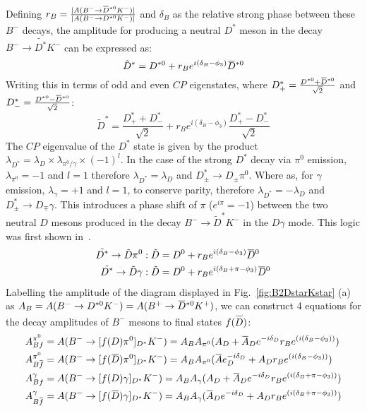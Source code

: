 \documentclass[oneside,12pt]{article}
\newcommand{\overbar}[1]{\mkern 1.5mu\overline{\mkern-1.5mu#1\mkern-1.5mu}\mkern
1.5mu}
\newcommand\brobor{\smash[b]{\raisebox{0.6\height}{\scalebox{0.5}{\tiny(}}{\mkern-1.5mu\scriptstyle-\mkern-1.5mu}\raisebox{0.6\height}{\scalebox{0.5}{\tiny)}}}}
\begin{document}
\noindent Defining $r_B=\frac{|A(B^{-}\rightarrow
\overbar{D}^{*0}K^-)|}{|A(B^{-}\rightarrow {D}^{*0}K^-)|}$ and $\delta_{B}$ as 
the relative strong phase between these $B^-$ decays, the amplitude for
producing a neutral ${D}^*$ meson in the decay $B^-\rightarrow \tilde{D^*}K^-$
can be expressed as:
\begin{equation}
  \tilde{D}^*=D^{*0}+r_Be^{i(\delta_B-\phi_3)}\overbar{D}^{*0}
  \label{eq:DstTilde}
\end{equation}
\noindent Writing this in terms of odd and even $CP$ eigenstates, where
$D^{*}_{+}=\frac{D^{*0}+\overbar{D}^{*0}}{\sqrt{2}}$ and
$D^{*}_{-}=\frac{D^{*0}-\overbar{D}^{*0}}{\sqrt{2}}$:
\begin{equation}
  \tilde{D}^*=\frac{D^{*}_{+}+D^{*}_{-}}{\sqrt{2}}+r_Be^{i(\delta_B-\phi_3)}\frac{D^{*}_{+}-D^{*}_{-}}{\sqrt{2}}
  \label{eq:DstTildeCP}
\end{equation}
\noindent The $CP$ eigenvalue of the $D^*$ state is given by the product
$\lambda_{D^*}=\lambda_D\times \lambda_{\pi^0\text{/}\gamma} \times(-1)^l$. In
the case of the strong $D^*$ decay via $\pi^0$ emission, $\lambda_{\pi^0}=-1$
and $l=1$ therefore $\lambda_{D^*}=\lambda_D$ and $D^*_{\pm}\rightarrow
D_{\pm}\pi^0$. Where as, for $\gamma$ emission, $\lambda_{\gamma}=+1$ and
$l=1$, to conserve parity, therefore $\lambda_{D^*}=-\lambda_D$ and
$D^*_{\pm}\rightarrow D_{\mp}\gamma$.  This introduces a phase shift of $\pi$
($e^{i\pi}=-1$) between the two neutral $D$ mesons produced in the decay
$B^-\rightarrow \tilde{D}^*K^-$ in the $D\gamma$ mode. This logic was first
shown in~\cite{ADSDstar}.
\begin{align}
  \tilde{D^*}\rightarrow \tilde{D}\pi^0 &:
  \tilde{D}=D^0+r_Be^{i(\delta_B-\phi_3)}\overbar{D}^0 \\
  \tilde{D^*}\rightarrow \tilde{D}\gamma &:
  \tilde{D}=D^0+r_Be^{i(\delta_B+\pi-\phi_3)}\overbar{D}^0
\end{align}
Labelling the amplitude of the diagram displayed in Fig.~\ref{fig:B2DstarKstar}
(a) as $A_{B}=A(B^{-}\rightarrow D^{*0}K^{-})=A(B^{+}\rightarrow
\overbar{D}^{*0}K^{+})$, we can construct 4 equations for the decay amplitudes
of $B^{-}$ mesons to final states $f(\accentset{\brobor}{D}\phantom{})$:
\begin{align}
  A_{Bf}^{\pi^{0}}&=A(B^{-}\rightarrow
  [f(D)\pi^{0}]_{D^{*}}K^{-})=A_{B}A_{\pi^{0}}(A_{D}+\overbar{A}_{D}e^{-i\delta_D}r_{B}e^{(i(\delta_{B}-\phi_{3}))})
  \\
  A_{B\overbar{f}}^{\pi^{0}}&=A(B^{-}\rightarrow
  [f(\overbar{D})\pi^{0}]_{D^{*}}K^{-})=A_{B}A_{\pi^{0}}(\overbar{A}e^{-i\delta_D}_{D}+A_{D}r_{B}e^{(i(\delta_{B}-\phi_{3}))})
  \\
  A_{Bf}^{\gamma}&=A(B^{-}\rightarrow
  [f(D)\gamma]_{D^{*}}K^{-})=A_{B}A_{\gamma}(A_{D}+\overbar{A}_{D}e^{-i\delta_D}r_{B}e^{(i(\delta_{B}+\pi-\phi_{3}))})
  \\
  A_{B\overbar{f}}^{\gamma}&=A(B^{-}\rightarrow
  [f(\overbar{D})\gamma]_{D^{*}}K^{-})=A_{B}A_{\gamma}(\overbar{A}_{D}e^{-i\delta_D}+A_{D}r_{B}e^{(i(\delta_{B}+\pi-\phi_{3}))})
\end{align}
\end{document}
